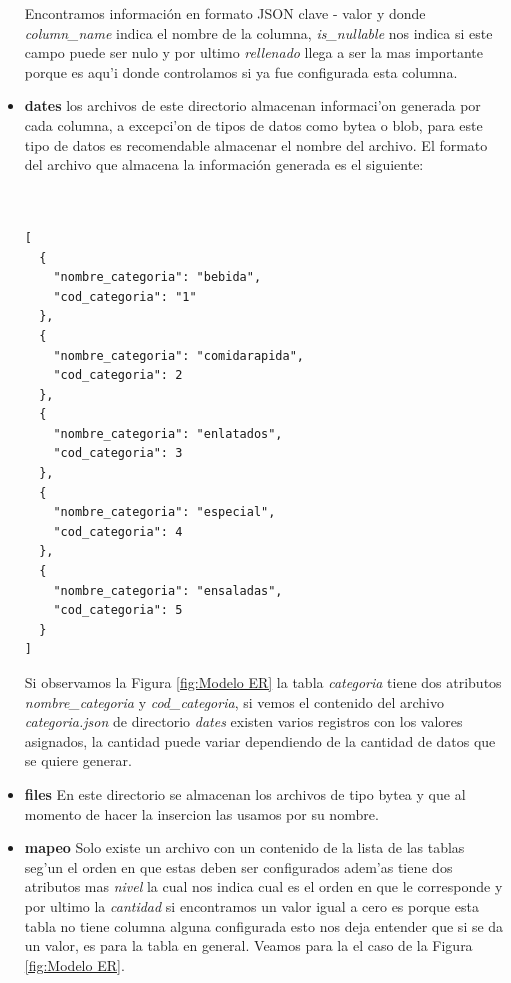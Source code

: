 \begin{itemize}
Encontramos informaci\'on en formato JSON clave - valor y donde \textit{column\_name} indica el nombre de la columna, \textit{is\_nullable} nos indica si este campo puede ser nulo y por ultimo \textit{rellenado} llega a ser la mas importante porque es aqu'i donde controlamos si ya fue configurada esta columna.
\item \textbf{dates} los archivos de este directorio almacenan informaci'on generada por cada columna, a excepci'on de tipos de datos como bytea o blob, para este tipo de datos es recomendable almacenar el nombre del archivo. El formato del archivo que almacena la informaci\'on generada es el siguiente:\\\\\\
\lstset{language=java,breaklines=true}
\label{tablaCompraProductoArchivoControl}
\begin{lstlisting}
[
  {
    "nombre_categoria": "bebida",
    "cod_categoria": "1"
  },
  {
    "nombre_categoria": "comidarapida",
    "cod_categoria": 2
  },
  {
    "nombre_categoria": "enlatados",
    "cod_categoria": 3
  },
  {
    "nombre_categoria": "especial",
    "cod_categoria": 4
  },
  {
    "nombre_categoria": "ensaladas",
    "cod_categoria": 5
  }
]
\end{lstlisting}
Si observamos la Figura \ref{fig:Modelo ER} la tabla \textit{categoria} tiene dos atributos \textit{nombre\_categoria} y \textit{cod\_categoria}, si vemos el contenido del archivo \textit{categoria.json} de directorio \textit{dates} existen varios registros con los valores asignados, la cantidad puede variar dependiendo de la cantidad de datos que se quiere generar.
 \item \textbf{files} En este directorio se almacenan los archivos de tipo bytea y que al momento de hacer la insercion las usamos por su nombre.
 \item \textbf{mapeo} Solo existe un archivo con un contenido de la lista de las tablas seg'un el orden en que estas deben ser configurados adem'as tiene dos atributos mas \textit{nivel} la cual nos indica cual es el orden en que le corresponde y por ultimo la \textit{cantidad} si encontramos un valor igual a cero es porque esta tabla no tiene columna alguna configurada esto nos deja entender que si se da un valor, es para la tabla en general. Veamos para la el caso de la Figura \ref{fig:Modelo ER}.\\
\lstset{language=java,breaklines=true}
\label{tablaCompraProductoArchivoControl}

\end{itemize}
